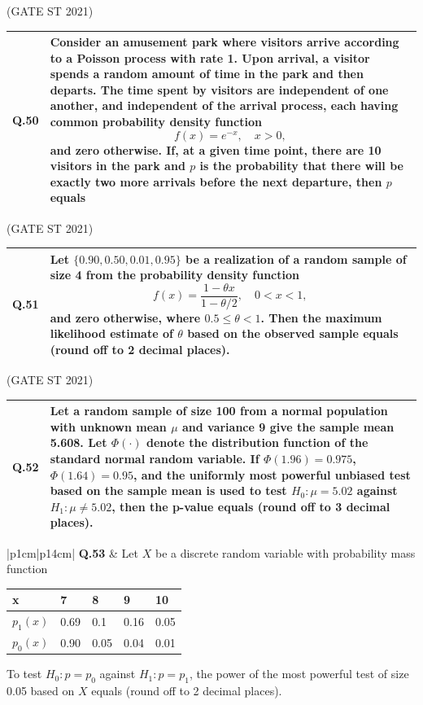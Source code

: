 \documentclass[journal,12pt,onecolumn]{IEEEtran}
\theoremstyle{remark}
\begin{document}
\bigskip
\hfill (GATE ST 2021)
\\
\begin{tabular}{|p{1cm}|p{14cm}|}
\hline
\textbf{Q.50} &
Consider an amusement park where visitors arrive according to a Poisson process with rate 1. Upon arrival, a visitor spends a random amount of time in the park and then departs. The time spent by visitors are independent of one another, and independent of the arrival process, each having common probability density function
$$
f(x) = e^{-x}, \quad x > 0,
$$
and zero otherwise. If, at a given time point, there are 10 visitors in the park and $p$ is the probability that there will be exactly two more arrivals before the next departure, then $p$ equals\\
\hline
\end{tabular}

\bigskip
\hfill (GATE ST 2021)
\\
\begin{tabular}{|p{1cm}|p{14cm}|}
\hline
\textbf{Q.51} &
Let $\{0.90, 0.50, 0.01, 0.95\}$ be a realization of a random sample of size 4 from the probability density function
$$
f(x) = \frac{1 - \theta x}{1 - \theta/2}, \quad 0 < x < 1,
$$
and zero otherwise, where $0.5 \leq \theta < 1$. Then the maximum likelihood estimate of $\theta$ based on the observed sample equals (round off to 2 decimal places).\\
\hline
\end{tabular}

\bigskip
\hfill (GATE ST 2021)
\\
\begin{tabular}{|p{1cm}|p{14cm}|}
\hline
\textbf{Q.52} &
Let a random sample of size 100 from a normal population with unknown mean $\mu$ and variance 9 give the sample mean 5.608. Let $\Phi(\cdot)$ denote the distribution function of the standard normal random variable. If $\Phi(1.96) = 0.975$, $\Phi(1.64) = 0.95$, and the uniformly most powerful unbiased test based on the sample mean is used to test $H_0: \mu = 5.02$ against $H_1: \mu \neq 5.02$, then the p-value equals (round off to 3 decimal places).\\
\hline
\end{tabular}

\bigskip
\begin{tabular}{|p{1cm}|p{14cm}|}
\hline
\textbf{Q.53} &
Let $X$ be a discrete random variable with probability mass function

\begin{tabular}{|p{1cm}|p{1cm}|p{1cm}|p{1cm}|p{1cm}|}
\hline
x & 7 & 8 & 9 & 10 \\
\hline
$p_1(x)$ & 0.69 & 0.1 & 0.16 & 0.05 \\
\hline
$p_0(x)$ & 0.90 & 0.05 & 0.04 & 0.01\\
\hline
\end{tabular} 
\bigskip
To test $H_0: p = p_0$ against $H_1: p = p_1$, the power of the most powerful test of size 0.05 based on $X$ equals (round off to 2 decimal places).\\
\hline
\end{tabular}
\end{document}
